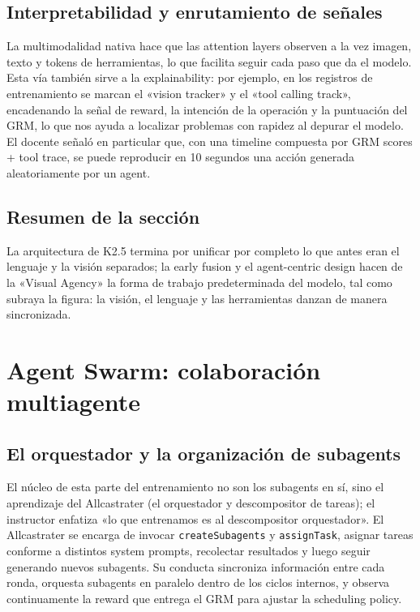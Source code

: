 \documentclass[a4paper]{article}
\begin{document}
\subsection{Interpretabilidad y enrutamiento de señales}
La multimodalidad nativa hace que las attention layers observen a la vez imagen, texto y tokens de herramientas, lo que facilita seguir cada paso que da el modelo. Esta vía también sirve a la explainability: por ejemplo, en los registros de entrenamiento se marcan el «vision tracker» y el «tool calling track», encadenando la señal de reward, la intención de la operación y la puntuación del GRM, lo que nos ayuda a localizar problemas con rapidez al depurar el modelo. El docente señaló en particular que, con una timeline compuesta por GRM scores + tool trace, se puede reproducir en 10 segundos una acción generada aleatoriamente por un agent.

\subsection{Resumen de la sección}
La arquitectura de K2.5 termina por unificar por completo lo que antes eran el lenguaje y la visión separados; la early fusion y el agent-centric design hacen de la «Visual Agency» la forma de trabajo predeterminada del modelo, tal como subraya la figura: la visión, el lenguaje y las herramientas danzan de manera sincronizada.
\section{Agent Swarm: colaboración multiagente}

\subsection{El orquestador y la organización de subagents}
El núcleo de esta parte del entrenamiento no son los subagents en sí, sino el aprendizaje del Allcastrater (el orquestador y descompositor de tareas); el instructor enfatiza «lo que entrenamos es al descompositor orquestador». El Allcastrater se encarga de invocar \texttt{createSubagents} y \texttt{assignTask}, asignar tareas conforme a distintos system prompts, recolectar resultados y luego seguir generando nuevos subagents. Su conducta sincroniza información entre cada ronda, orquesta subagents en paralelo dentro de los ciclos internos, y observa continuamente la reward que entrega el GRM para ajustar la scheduling policy.
\end{document}
